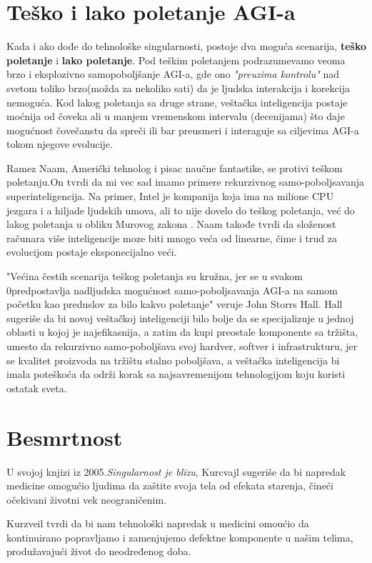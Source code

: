 \documentclass[a4paper]{article}
\begin{document}
\section{Teško i lako poletanje AGI-a}
\label{sec:poletanje}
Kada i ako dođe do tehnološke singularnosti, postoje dva moguća scenarija, \textbf{teško poletanje} i \textbf {lako poletanje}.
Pod teškim poletanjem podrazumevamo veoma brzo i eksplozivno samopoboljšanje AGI-a, gde ono \textit{"preuzima kontrolu"} nad svetom toliko brzo(možda za nekoliko sati) da je ljudska interakcija i korekcija nemoguća. Kod lakog poletanja sa druge strane, veštačka inteligencija postaje moćnija od čoveka ali u manjem vremenskom intervalu (decenijama) što daje mogućnost čovečanstu da spreči ili bar preusmeri i interaguje sa ciljevima AGI-a tokom njegove evolucije.\cite{refe1}

Ramez Naam, Američki tehnolog i pisac naučne fantastike, se protivi teškom poletanju.On tvrdi da mi vec sad imamo primere rekurzivnog samo-poboljsavanja superinteligencija. Na primer, Intel je kompanija koja ima na milione CPU jezgara i a hiljade ljudskih umova, ali to nije dovelo do teškog poletanja, već do lakog poletanja u obliku Murovog zakona \cite{refe2}. Naam takođe tvrdi da složenost računara više inteligencije moze biti mnogo veća od linearne, čime i trud za evolucijom postaje eksponecijalno veći.\cite{refe3}

"Većina čestih scenarija teškog poletanja su kružna, jer se u svakom 0predpostavlja nadljudska mogućnost samo-poboljsavanja AGI-a na samom početku kao preduslov za bilo kakvo poletanje" veruje John Storrs Hall. Hall sugeriše da bi novoj veštačkoj inteligenciji bilo bolje da se specijalizuje u jednoj oblasti u kojoj je najefikasnija, a zatim da kupi preostale komponente sa tržišta, umesto da rekurzivno samo-poboljšava svoj hardver, softver i infrastrukturu, jer se kvalitet proizvoda na tržištu stalno poboljšava, a veštačka inteligencija bi imala poteškoća da održi korak sa najsavremenijom tehnologijom koju koristi ostatak sveta.\cite{refe4}

\section{Besmrtnost}
\label{sec:besmrtnost}
  U svojoj knjizi iz 2005.\textit {Singularnost je blizu}, Kurcvajl sugeriše da bi napredak medicine omogućio ljudima da zaštite svoja tela od efekata starenja, čineći očekivani životni vek neograničenim. 
  
  Kurzveil tvrdi da bi nam tehnološki napredak u medicini omoućio da kontinuirano popravljamo i zamenjujemo defektne komponente u našim telima, produžavajući život do neodređenog doba.
  
\end{document}
